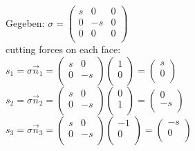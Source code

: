 \begin{minipage}{14cm}
	Gegeben: $\sigma = \begin{pmatrix}
	s & 0 & 0\\
	0 & -s & 0\\
	0 & 0 & 0\\
	\end{pmatrix} $\\
	cutting forces on each face:\\
	$s_1 = \sigma \vec n_1 = \begin{pmatrix}
	s & 0\\
	0 & -s\\
	\end{pmatrix} \begin{pmatrix}
	1\\
	0\\
	\end{pmatrix} = \begin{pmatrix}
	s\\
	0\\
	\end{pmatrix}$\\
	
	$s_2 = \sigma \vec n_2 = \begin{pmatrix}
	s & 0\\
	0 & -s\\
	\end{pmatrix} \begin{pmatrix}
	0\\
	1\\
	\end{pmatrix} = \begin{pmatrix}
	0\\
	-s\\
	\end{pmatrix}$\\
	
	$s_3 = \sigma \vec n_3 = \begin{pmatrix}
	s & 0\\
	0 & -s\\
	\end{pmatrix} \begin{pmatrix}
	-1\\
	0\\
	\end{pmatrix} = \begin{pmatrix}
	-s\\
	0\\
	\end{pmatrix}$\\
	

\end{minipage}
